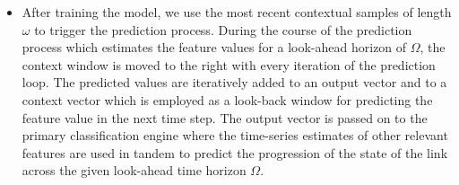 \documentclass{article}
\begin{document}
\begin{itemize}
    \item After training the model, we use the most recent contextual samples of length $\omega$ to trigger the prediction process. During the course of the prediction process which estimates the feature values for a look-ahead horizon of $\Omega$, the context window is moved to the right with every iteration of the prediction loop. The predicted values are iteratively added to an output vector and to a context vector which is employed as a look-back window for predicting the feature value in the next time step. The output vector is passed on to the primary classification engine where the time-series estimates of other relevant features are used in tandem to predict the progression of the state of the link across the given look-ahead time horizon $\Omega$.
\end{itemize}
\end{document}
